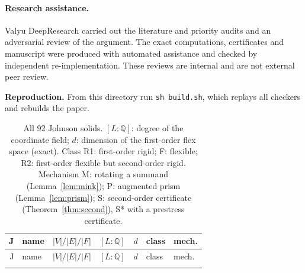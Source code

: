 \documentclass[11pt]{amsart}
\theoremstyle{remark}
\newcommand{\Q}{\mathbb Q}
\begin{document}
\paragraph{Research assistance.}
Valyu DeepResearch carried out the literature and priority audits and an adversarial review of the argument. The exact computations, certificates and manuscript were produced with automated assistance and checked by independent re-implementation. These reviews are internal and are not external peer review.

\smallskip
\noindent\textbf{Reproduction.} From this directory run \texttt{sh build.sh}, which replays all checkers and rebuilds the paper.




\clearpage
{\footnotesize
\setlength{\tabcolsep}{4pt}
\begin{longtable}{rlcccll}
\caption{All 92 Johnson solids. $[L:\Q]$: degree of the coordinate field; $d$: dimension of the first-order flex space (exact). Class R1: first-order rigid; F: flexible; R2: first-order flexible but second-order rigid. Mechanism M: rotating a summand (Lemma~\ref{lem:mink}); P: augmented prism (Lemma~\ref{lem:prism}); S: second-order certificate (Theorem~\ref{thm:second}), S* with a prestress certificate.}\label{tab:all}\\
\toprule
J & name & $|V|/|E|/|F|$ & $[L:\Q]$ & $d$ & class & mech.\\
\midrule
\endfirsthead
\toprule
J & name & $|V|/|E|/|F|$ & $[L:\Q]$ & $d$ & class & mech.\\
\midrule
\endhead
\bottomrule
\endlastfoot

\end{longtable}
}
\end{document}
